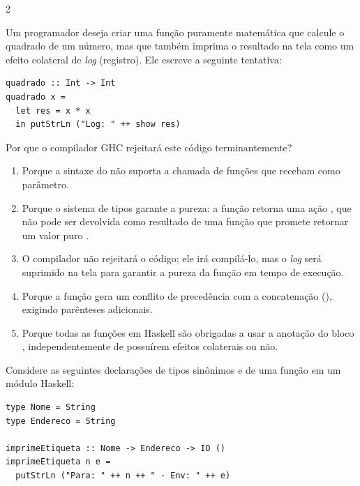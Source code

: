 \documentclass[a4paper,10pt,brazil]{article}
\begin{document}
\begin{multicols}{2}
\begin{enumerate}
\end{enumerate}

Um programador deseja criar uma função puramente matemática que calcule o quadrado de um número, mas que também imprima o resultado na tela como um efeito colateral de \emph{log} (registro). Ele escreve a seguinte tentativa:

\begin{verbatim}
quadrado :: Int -> Int
quadrado x = 
  let res = x * x
  in putStrLn ("Log: " ++ show res)
\end{verbatim}

Por que o compilador GHC rejeitará este código terminantemente?

\begin{enumerate}
  \item Porque a sintaxe do  não suporta a chamada de funções que recebam  como parâmetro.

  \item Porque o sistema de tipos garante a pureza: a função  retorna uma ação , que não pode ser devolvida como resultado de uma função que promete retornar um valor puro .

  \item O compilador não rejeitará o código; ele irá compilá-lo, mas o \emph{log} será suprimido na tela para garantir a pureza da função em tempo de execução.

  \item Porque a função  gera um conflito de precedência com a concatenação (\haskellinline{++}), exigindo parênteses adicionais.

  \item Porque todas as funções em Haskell são obrigadas a usar a anotação do bloco , independentemente de possuírem efeitos colaterais ou não.


\end{enumerate}

Considere as seguintes declarações de tipos sinônimos e de uma função em um módulo Haskell:

\begin{verbatim}
type Nome = String
type Endereco = String

imprimeEtiqueta :: Nome -> Endereco -> IO ()
imprimeEtiqueta n e =
  putStrLn ("Para: " ++ n ++ " - Env: " ++ e)
\end{verbatim}


\end{multicols}
\end{document}
